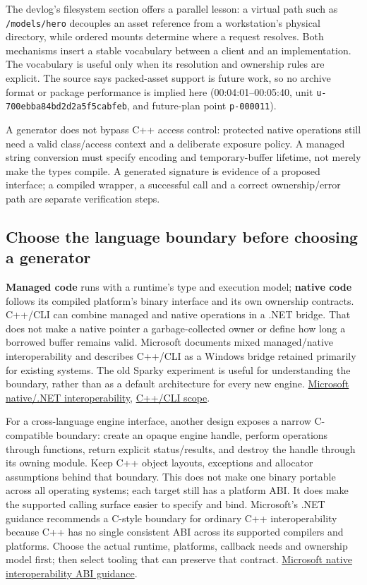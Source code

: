The devlog's filesystem section offers a parallel lesson: a virtual path such as \texttt{/models/hero} decouples an asset reference from a workstation's physical directory, while ordered mounts determine where a request resolves. Both mechanisms insert a stable vocabulary between a client and an implementation. The vocabulary is useful only when its resolution and ownership rules are explicit. The source says packed-asset support is future work, so no archive format or package performance is implied here (00:04:01--00:05:40, unit \texttt{u-700ebba84bd2d2a5f5cabfeb}, and future-plan point \texttt{p-000011}).

A generator does not bypass C++ access control: protected native operations still need a valid class/access context and a deliberate exposure policy. A managed string conversion must specify encoding and temporary-buffer lifetime, not merely make the types compile. A generated signature is evidence of a proposed interface; a compiled wrapper, a successful call and a correct ownership/error path are separate verification steps.

\subsection{Choose the language boundary before choosing a generator}\label{01-foundations-i-ch016-choose-the-language-boundary-before-choosing-a-generator}

\textbf{Managed code} runs with a runtime's type and execution model; \textbf{native code} follows its compiled platform's binary interface and its own ownership contracts. C++/CLI can combine managed and native operations in a .NET bridge. That does not make a native pointer a garbage-collected owner or define how long a borrowed buffer remains valid. Microsoft documents mixed managed/native interoperability and describes C++/CLI as a Windows bridge retained primarily for existing systems. The old Sparky experiment is useful for understanding the boundary, rather than as a default architecture for every new engine. \href{https://learn.microsoft.com/en-us/cpp/dotnet/native-and-dotnet-interoperability}{Microsoft native/.NET interoperability}, \href{https://learn.microsoft.com/en-us/cpp/dotnet/}{C++/CLI scope}.

For a cross-language engine interface, another design exposes a narrow C-compatible boundary: create an opaque engine handle, perform operations through functions, return explicit status/results, and destroy the handle through its owning module. Keep C++ object layouts, exceptions and allocator assumptions behind that boundary. This does not make one binary portable across all operating systems; each target still has a platform ABI. It does make the supported calling surface easier to specify and bind. Microsoft's .NET guidance recommends a C-style boundary for ordinary C++ interoperability because C++ has no single consistent ABI across its supported compilers and platforms. Choose the actual runtime, platforms, callback needs and ownership model first; then select tooling that can preserve that contract. \href{https://learn.microsoft.com/dotnet/standard/native-interop/abi-support}{Microsoft native interoperability ABI guidance}.

